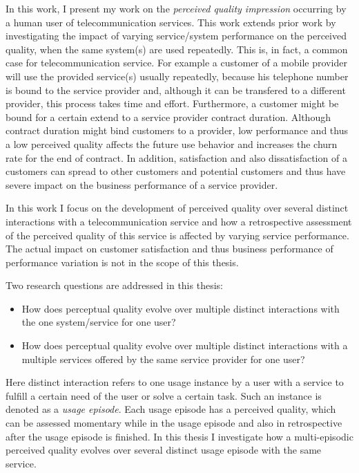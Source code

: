 In this work, I present my work on the \emph{perceived quality impression} occurring by a human user of telecommunication services.
This work extends prior work by investigating the impact of varying service/system performance on the perceived quality, when the same system(s) are used repeatedly.
This is, in fact, a common case for telecommunication service.
For example a customer of a mobile  provider will use the provided service(s) usually repeatedly, because his telephone number is bound to the service provider and, although it can be transfered to a different provider, this process takes time and effort.
Furthermore, a customer might be bound for a certain extend to a service provider contract duration.
Although contract duration might bind customers to a provider, low performance and thus a low perceived quality affects the future use behavior and increases the churn rate for the end of contract.
In addition, satisfaction and also dissatisfaction of a customers can spread to other customers and potential customers and thus have severe impact on the business performance of a service provider.

In this work I focus on the development of perceived quality over several distinct interactions with a telecommunication service and how a retrospective assessment of the perceived quality of this service is affected by varying service performance.
The actual impact on customer satisfaction and thus business performance of performance variation is not in the scope of this thesis.

Two research questions are addressed in this thesis:
\begin{itemize}
\item How does perceptual quality evolve over multiple distinct interactions with the one system/service for one user?
\item How does perceptual quality evolve over multiple distinct interactions with a multiple services offered by the same service provider for one user?
\end{itemize}

Here distinct interaction refers to one usage instance by a user with a service to fulfill a certain need of the user or solve a certain task.
Such an instance is denoted as a \emph{usage episode}.
Each usage episode has a perceived quality, which can be assessed momentary while in the usage episode and also in retrospective after the usage episode is finished.
In this thesis I investigate how a multi-episodic perceived quality evolves over several distinct usage episode with the same service.

